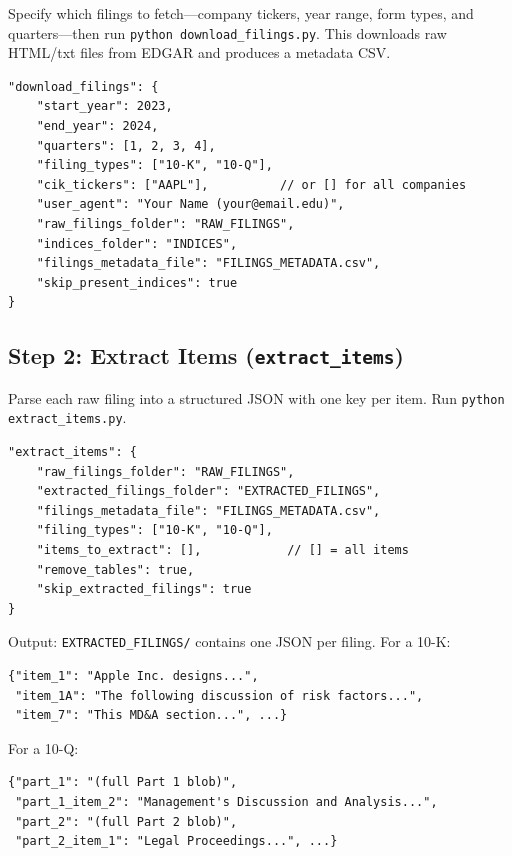 \documentclass[11pt]{article}
\begin{document}
Specify which filings to fetch---company tickers, year range, form types,
and quarters---then run \texttt{python download\_filings.py}. This downloads
raw HTML/txt files from EDGAR and produces a metadata CSV.

\begin{lstlisting}[language={}]
"download_filings": {
    "start_year": 2023,
    "end_year": 2024,
    "quarters": [1, 2, 3, 4],
    "filing_types": ["10-K", "10-Q"],
    "cik_tickers": ["AAPL"],          // or [] for all companies
    "user_agent": "Your Name (your@email.edu)",
    "raw_filings_folder": "RAW_FILINGS",
    "indices_folder": "INDICES",
    "filings_metadata_file": "FILINGS_METADATA.csv",
    "skip_present_indices": true
}
\end{lstlisting}

\subsection*{Step 2: Extract Items (\texttt{extract\_items})}

Parse each raw filing into a structured JSON with one key per item. Run
\texttt{python extract\_items.py}.

\begin{lstlisting}[language={}]
"extract_items": {
    "raw_filings_folder": "RAW_FILINGS",
    "extracted_filings_folder": "EXTRACTED_FILINGS",
    "filings_metadata_file": "FILINGS_METADATA.csv",
    "filing_types": ["10-K", "10-Q"],
    "items_to_extract": [],            // [] = all items
    "remove_tables": true,
    "skip_extracted_filings": true
}
\end{lstlisting}

Output: \texttt{EXTRACTED\_FILINGS/} contains one JSON per filing. For a 10-K:

\begin{lstlisting}[language={}]
{"item_1": "Apple Inc. designs...",
 "item_1A": "The following discussion of risk factors...",
 "item_7": "This MD&A section...", ...}
\end{lstlisting}

For a 10-Q:

\begin{lstlisting}[language={}]
{"part_1": "(full Part 1 blob)",
 "part_1_item_2": "Management's Discussion and Analysis...",
 "part_2": "(full Part 2 blob)",
 "part_2_item_1": "Legal Proceedings...", ...}
\end{lstlisting}

\end{document}
